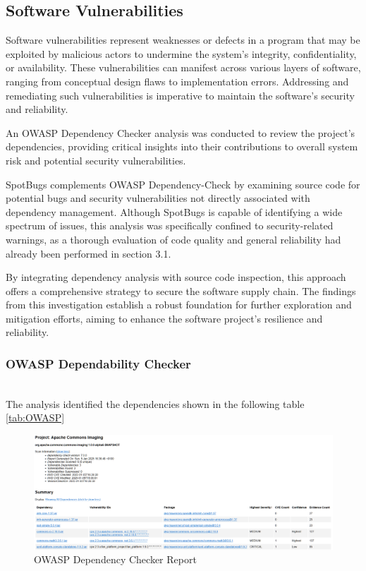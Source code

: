 \documentclass[sigconf]{acmart}
\begin{document}
\subsection{Software Vulnerabilities}
Software vulnerabilities represent weaknesses or defects in a program that may be exploited by malicious actors to undermine the system's integrity, confidentiality, or availability. These vulnerabilities can manifest across various layers of software, ranging from conceptual design flaws to implementation errors. Addressing and remediating such vulnerabilities is imperative to maintain the software's security and reliability.

An OWASP Dependency Checker\cite{owasp-dependency-check} analysis was conducted to review the project's dependencies, providing critical insights into their contributions to overall system risk and potential security vulnerabilities.

SpotBugs\cite{spotbugs} complements OWASP Dependency-Check by examining source code for potential bugs and security vulnerabilities not directly associated with dependency management. Although SpotBugs is capable of identifying a wide spectrum of issues, this analysis was specifically confined to security-related warnings, as a thorough evaluation of code quality and general reliability had already been performed in section 3.1.

By integrating dependency analysis with source code inspection, this approach offers a comprehensive strategy to secure the software supply chain. The findings from this investigation establish a robust foundation for further exploration and mitigation efforts, aiming to enhance the software project's resilience and reliability.

\subsubsection{OWASP Dependability Checker}\hfill\\
The analysis identified the dependencies shown in the following table \ref{tab:OWASP}

\begin{figure}[h!]
    \centering
    \includegraphics[width=1\linewidth]{OWASP.PNG}
    \caption{OWASP Dependency Checker Report}
    \label{fig:OWASP_FIG}
\end{figure}
\end{document}
